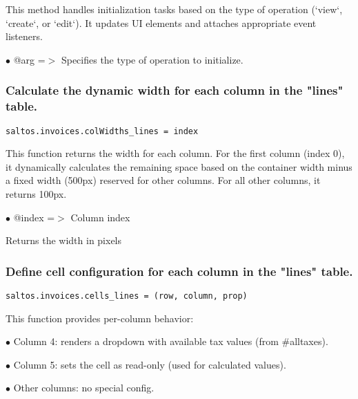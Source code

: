 \documentclass[a4paper]{article}
\begin{document}
This method handles initialization tasks based on the type of operation (`view`, `create`, or `edit`).
It updates UI elements and attaches appropriate event listeners.

\begin{compactitem}
\item[\color{myblue}$\bullet$] @arg =$>$ Specifies the type of operation to initialize.
\end{compactitem}

\hypertarget{toc157}{}
\subsubsection{Calculate the dynamic width for each column in the "lines" table.}

\begin{lstlisting}
saltos.invoices.colWidths_lines = index
\end{lstlisting}

This function returns the width for each column. For the first column (index 0),
it dynamically calculates the remaining space based on the container width minus
a fixed width (500px) reserved for other columns. For all other columns, it returns 100px.

\begin{compactitem}
\item[\color{myblue}$\bullet$] @index =$>$ Column index
\end{compactitem}

Returns the width in pixels

\hypertarget{toc158}{}
\subsubsection{Define cell configuration for each column in the "lines" table.}

\begin{lstlisting}
saltos.invoices.cells_lines = (row, column, prop)
\end{lstlisting}

This function provides per-column behavior:

\begin{compactitem}
\item[\color{myblue}$\bullet$] Column 4: renders a dropdown with available tax values (from \#alltaxes).
\item[\color{myblue}$\bullet$] Column 5: sets the cell as read-only (used for calculated values).
\item[\color{myblue}$\bullet$] Other columns: no special config.
\end{compactitem}
\end{document}
